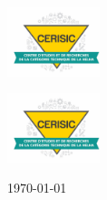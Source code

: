 \vfill
\begin{minipage}{0.47\textwidth}
	\begin{flushleft}
\includegraphics[height=2cm]{../../Images/CERISIC_Logo.jpg}
	\end{flushleft}
\end{minipage}
\hfill
\begin{minipage}{0.47\textwidth}
	\begin{flushright}
\includegraphics[height=2cm]{../../Images/CERISIC_Logo.jpg}
	\end{flushright}
\end{minipage}
\vspace{1cm}
\begin{center}
	\begin{Large}
		\today
	\end{Large}
\end{center}


\endgroup
\cleardoublepage